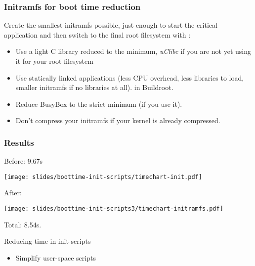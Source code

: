 \begin{frame}
\frametitle{Initramfs for boot time reduction}
Create the smallest initramfs possible, just enough to start the critical
application and then switch to the final root filesystem with
:
\begin{itemize}
\item Use a light C library reduced to the minimum,
      {\em uClibc} if you are not yet using it for your root filesystem
\item Use statically linked applications (less CPU overhead, less
      libraries to load, smaller initramfs if no libraries at all).
       in Buildroot.
\item Reduce BusyBox to the strict minimum (if you use it).  
\item Don't compress your initramfs if your kernel is already
      compressed.
\end{itemize}
\end{frame}

\begin{frame}
\frametitle{Results}
Before: 9.67s
\begin{center}
    \texttt{[image: slides/boottime-init-scripts/timechart-init.pdf]}
\end{center}
After:
\begin{center}
    \texttt{[image: slides/boottime-init-scripts3/timechart-initramfs.pdf]}
\end{center}
Total: 8.54s.
\end{frame}

\setuplabframe
{Reducing time in init-scripts}
{
\begin{itemize}
\item Simplify user-space scripts
\end{itemize}
}
